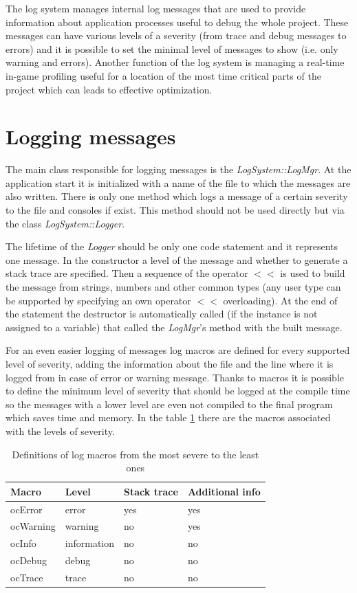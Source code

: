 \documentclass[a4paper, 12pt]{report}
\begin{document}
The log system manages internal log messages that are used to provide information about application processes useful to debug the whole project. These messages can have various levels of a severity (from trace and debug messages to errors) and it is possible to set the minimal level of messages to show (i.e. only warning and errors). Another function of the log system is managing a real-time in-game profiling useful for a location of the most time critical parts of the project which can leads to effective optimization.

\section{Logging messages}
\label{sec:logging}

The main class responsible for logging messages is the \emph{LogSystem::LogMgr}. At the application start it is initialized with a name of the file to which the messages are also written. There is only one method which logs a message of a certain severity to the file and consoles if exist. This method should not be used directly but via the class \emph{LogSystem::Logger}.

The lifetime of the \emph{Logger} should be only one code statement and it represents one message. In the constructor a level of the message and whether to generate a stack trace are specified. Then a sequence of the operator $<<$ is used to build the message from strings, numbers and other common types (any user type can be supported by specifying an own operator $<<$ overloading). At the end of the statement the destructor is automatically called (if the instance is not assigned to a variable) that called the \emph{LogMgr}'s method with the built message.

For an even easier logging of messages log macros are defined for every supported level of severity, adding the information about the file and the line where it is logged from in case of error or warning message. Thanks to macros it is possible to define the minimum level of severity that should be logged at the compile time so the messages with a lower level are even not compiled to the final program which saves time and memory. In the table \ref{tab:log-macros} there are the macros associated with the levels of severity.

\begin{table}[htbp]
	\centering
		\begin{tabular}{|l|l|l|l|}
			\hline
			Macro & Level & Stack trace & Additional info \\
			\hline
			ocError & error & yes & yes \\
			ocWarning & warning & no & yes \\
			ocInfo & information & no & no \\
			ocDebug & debug & no & no \\
			ocTrace & trace & no & no \\
			\hline
		\end{tabular}
	\caption[Definitions of log macros]{Definitions of log macros from the most severe to the least ones}
	\label{tab:log-macros}
\end{table}
\end{document}
